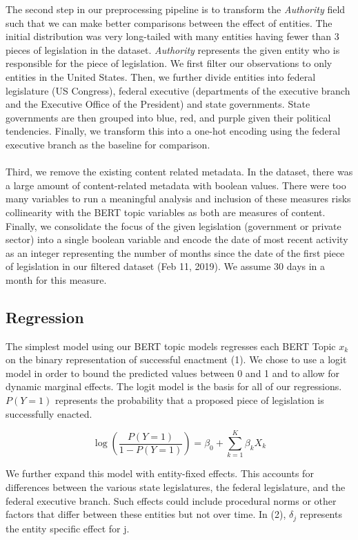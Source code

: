 \documentclass{article}
\begin{document}
\noindent
The second step in our preprocessing pipeline is to transform the \textit{Authority} field such that we can make better comparisons between the effect of entities. The initial distribution was very long-tailed with many entities having fewer than 3 pieces of legislation in the dataset. \textit{Authority} represents the given entity who is responsible for the piece of legislation. We first filter our observations to only entities in the United States. Then, we further divide entities into federal legislature (US Congress), federal executive (departments of the executive branch and the Executive Office of the President) and state governments. State governments are then grouped into blue, red, and purple given their political tendencies. Finally, we transform this into a one-hot encoding using the federal executive branch as the baseline for comparison.
\\\\
Third, we remove the existing content related metadata. In the dataset, there was a large amount of content-related metadata with boolean values. There were too many variables to run a meaningful analysis and inclusion of these measures risks collinearity with the BERT topic variables as both are measures of content. Finally, we consolidate the focus of the given legislation (government or private sector) into a single boolean variable and encode the date of most recent activity as an integer representing the number of months since the date of the first piece of legislation in our filtered dataset (Feb 11, 2019). We assume 30 days in a month for this measure. 

\subsection{Regression}

The simplest model using our BERT topic models regresses each BERT Topic $x_k$ on the binary representation of successful enactment (1). We chose to use a logit model in order to bound the predicted values between 0 and 1 and to allow for dynamic marginal effects. The logit model is the basis for all of our regressions. $P(Y=1)$ represents the probability that a proposed piece of legislation is successfully enacted. 

\begin{equation}
\log\left( \frac{P(Y=1)}{1 - P(Y=1)} \right) = \beta_0 + \sum_{k=1}^{K} \beta_k X_k
\end{equation}

We further expand this model with entity-fixed effects. This accounts for differences between the various state legislatures, the federal legislature, and the federal executive branch. Such effects could include procedural norms or other factors that differ between these entities but not over time. In (2), $\delta_j$ represents the entity specific effect for j.
\end{document}
